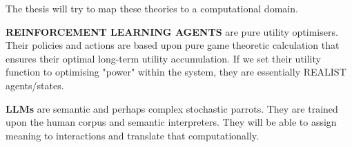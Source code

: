 The thesis will try to map these theories to a computational domain.

\textbf{REINFORCEMENT LEARNING AGENTS} are pure utility optimisers. Their policies and actions are based upon pure game theoretic calculation that ensures their optimal long-term utility accumulation. If we set their utility function to optimising "power" within the system, they are essentially REALIST agents/states.


\textbf{LLMs} are semantic and perhaps complex stochastic parrots. They are trained upon the human corpus and semantic interpreters. They will be able to assign meaning to interactions and translate that computationally.

